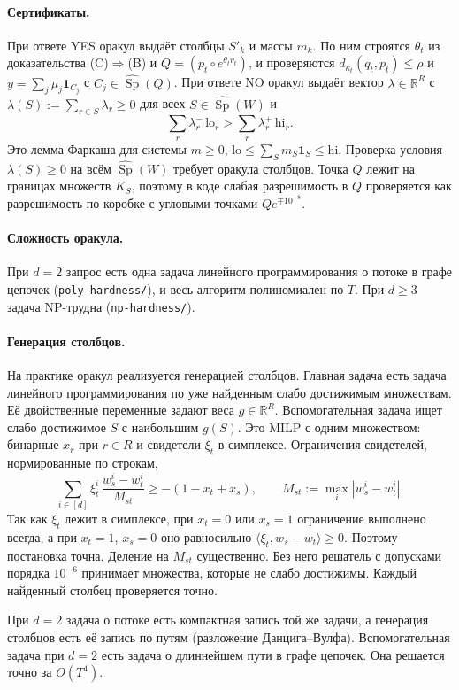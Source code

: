 \documentclass[a4paper,11pt]{article}
\theoremstyle{plain}
\theoremstyle{definition}
\theoremstyle{remark}
\newcommand{\R}{\mathbb{R}}
\newcommand{\abs}[1]{\left\lvert #1 \right\rvert}
\newcommand{\ip}[2]{\langle #1, #2\rangle} %
\DeclareMathOperator{\Sp}{Sp}
\begin{document}
\paragraph{Сертификаты.} При ответе YES оракул выдаёт столбцы $S'_k$ и массы $m_k$. По ним строятся $\theta_t$ из доказательства (C)$\Rightarrow$(B) и $Q=(p_t\circ e^{\theta_tv_t})$, и проверяются $d_{\kappa_t}(q_t,p_t)\le\rho$ и $y=\sum_j\mu_j\mathbf 1_{C_j}$ с $C_j\in\widehat{\Sp}(Q)$. При ответе NO оракул выдаёт вектор $\lambda\in\R^R$ с $\lambda(S):=\sum_{r\in S}\lambda_r\ge0$ для всех $S\in\widehat{\Sp}(W)$ и
\[
    \sum_r\lambda_r^-\,\mathrm{lo}_r>\sum_r\lambda_r^+\,\mathrm{hi}_r.
\]
Это лемма Фаркаша для системы $m\ge0$, $\mathrm{lo}\le\sum_Sm_S\mathbf 1_S\le\mathrm{hi}$. Проверка условия $\lambda(S)\ge0$ на всём $\widehat{\Sp}(W)$ требует оракула столбцов. Точка $Q$ лежит на границах множеств $K_S$, поэтому в коде слабая разрешимость в $Q$ проверяется как разрешимость по коробке с угловыми точками $Q e^{\mp10^{-8}}$.

\paragraph{Сложность оракула.} При $d=2$ запрос есть одна задача линейного программирования о потоке в графе цепочек (\texttt{poly-hardness/}), и весь алгоритм полиномиален по $T$. При $d\ge3$ задача NP-трудна (\texttt{np-hardness/}).

\paragraph{Генерация столбцов.} На практике оракул реализуется генерацией столбцов. Главная задача есть задача линейного программирования по уже найденным слабо достижимым множествам. Её двойственные переменные задают веса $g\in\R^R$. Вспомогательная задача ищет слабо достижимое $S$ с наибольшим $g(S)$. Это MILP с одним множеством: бинарные $x_r$ при $r\in R$ и свидетели $\xi_t$ в симплексе. Ограничения свидетелей, нормированные по строкам,
\[
    \sum_{i\in[d]}\xi_t^i\,\frac{w_s^i-w_t^i}{M_{st}}\ge-(1-x_t+x_s),\qquad M_{st}:=\max_i\abs{w_s^i-w_t^i}.
\]
Так как $\xi_t$ лежит в симплексе, при $x_t=0$ или $x_s=1$ ограничение выполнено всегда, а при $x_t=1$, $x_s=0$ оно равносильно $\ip{\xi_t}{w_s-w_t}\ge0$. Поэтому постановка точна. Деление на $M_{st}$ существенно. Без него решатель с допусками порядка $10^{-6}$ принимает множества, которые не слабо достижимы. Каждый найденный столбец проверяется точно.

При $d=2$ задача о потоке есть компактная запись той же задачи, а генерация столбцов есть её запись по путям (разложение Данцига--Вулфа). Вспомогательная задача при $d=2$ есть задача о длиннейшем пути в графе цепочек. Она решается точно за $O(T^4)$.
\end{document}

